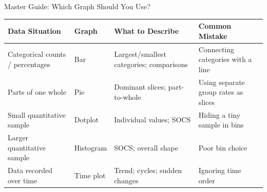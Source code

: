 \documentclass[aspectratio=169]{beamer}
\begin{document}
\begin{frame}{Master Guide: Which Graph Should You Use?}
  \begin{table}
    \centering
    \scriptsize
    \begin{tabularx}{\textwidth}{X l X X}
      \toprule
      \textbf{Data Situation} & \textbf{Graph} & \textbf{What to Describe} & \textbf{Common Mistake} \\
      \midrule
      Categorical counts / percentages & Bar & Largest/smallest categories; comparisons & Connecting categories with a line \\
      Parts of one whole & Pie & Dominant slices; part-to-whole & Using separate group rates as slices \\
      Small quantitative sample & Dotplot & Individual values; SOCS & Hiding a tiny sample in bins \\
      Larger quantitative sample & Histogram & SOCS; overall shape & Poor bin choice \\
      Data recorded over time & Time plot & Trend; cycles; sudden changes & Ignoring time order \\
      \bottomrule
    \end{tabularx}
  \end{table}
\end{frame}
\end{document}
